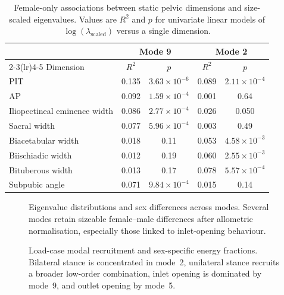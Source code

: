 \documentclass[openacc]{rsproca_new}
\begin{document}
\begin{table}[p]
\centering
\caption{Female-only associations between static pelvic dimensions and size-scaled eigenvalues. Values are $R^2$ and $p$ for univariate linear models of $\log(\lambda_{\mathrm{scaled}})$ versus a single dimension.}
\label{tab:staticassoc}
\begin{tabular}{lcccc}
\toprule
& \multicolumn{2}{c}{Mode 9} & \multicolumn{2}{c}{Mode 2} \\
\cmidrule(lr){2-3}\cmidrule(lr){4-5}
Dimension & $R^2$ & $p$ & $R^2$ & $p$ \\
\midrule
PIT & 0.135 & $3.63 \times 10^{-6}$ & 0.089 & $2.11 \times 10^{-4}$ \\
AP & 0.092 & $1.59 \times 10^{-4}$ & 0.001 & 0.64 \\
Iliopectineal eminence width & 0.086 & $2.77 \times 10^{-4}$ & 0.026 & 0.050 \\
Sacral width & 0.077 & $5.96 \times 10^{-4}$ & 0.003 & 0.49 \\
Biacetabular width & 0.018 & 0.11 & 0.053 & $4.58 \times 10^{-3}$ \\
Biischiadic width & 0.012 & 0.19 & 0.060 & $2.55 \times 10^{-3}$ \\
Bituberous width & 0.013 & 0.17 & 0.078 & $5.57 \times 10^{-4}$ \\
Subpubic angle & 0.071 & $9.84 \times 10^{-4}$ & 0.015 & 0.14 \\
\bottomrule
\end{tabular}
\end{table}



\begin{figure}[p]
\centering
{}
\caption{Eigenvalue distributions and sex differences across modes. Several modes retain sizeable female--male differences after allometric normalisation, especially those linked to inlet-opening behaviour.}
\label{fig:eigs}
\end{figure}

\begin{figure}[p]
\centering
{}
\caption{Load-case modal recruitment and sex-specific energy fractions. Bilateral stance is concentrated in mode~2, unilateral stance recruits a broader low-order combination, inlet opening is dominated by mode~9, and outlet opening by mode~5.}
\label{fig:recruitment}
\end{figure}
\end{document}
